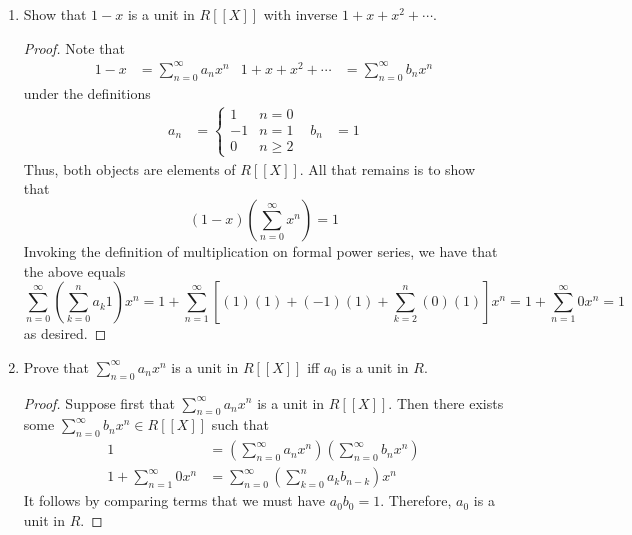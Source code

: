 \documentclass[../psets.tex]{subfiles}
\begin{document}
\begin{enumerate}
\begin{enumerate}[start=2,label={\textbf{(\alph*)}}]
        \item Show that $1-x$ is a unit in $R[[X]]$ with inverse $1+x+x^2+\cdots$.
        \begin{proof}
            Note that
            \begin{align*}
                1-x &= \sum_{n=0}^\infty a_nx^n&
                1+x+x^2+\cdots &= \sum_{n=0}^\infty b_nx^n
            \end{align*}
            under the definitions
            \begin{align*}
                a_n &=
                \begin{cases}
                    1 & n=0\\
                    -1 & n=1\\
                    0 & n\geq 2
                \end{cases}&
                b_n &= 1
            \end{align*}
            Thus, both objects are elements of $R[[X]]$. All that remains is to show that
            \begin{equation*}
                (1-x)\left( \sum_{n=0}^\infty x^n \right) = 1
            \end{equation*}
            Invoking the definition of multiplication on formal power series, we have that the above equals
            \begin{equation*}
                \sum_{n=0}^\infty\left( \sum_{k=0}^na_k1 \right)x^n = 1+\sum_{n=1}^\infty\left[ (1)(1)+(-1)(1)+\sum_{k=2}^n(0)(1) \right]x^n
                = 1+\sum_{n=1}^\infty 0x^n
                = 1
            \end{equation*}
            as desired.
        \end{proof}
        \item Prove that $\sum_{n=0}^\infty a_nx^n$ is a unit in $R[[X]]$ iff $a_0$ is a unit in $R$.
        \begin{proof}
            Suppose first that $\sum_{n=0}^\infty a_nx^n$ is a unit in $R[[X]]$. Then there exists some $\sum_{n=0}^\infty b_nx^n\in R[[X]]$ such that
            \begin{align*}
                1 &= \left( \sum_{n=0}^\infty a_nx^n \right)\left( \sum_{n=0}^\infty b_nx^n \right)\\
                1+\sum_{n=1}^\infty 0x^n &= \sum_{n=0}^\infty\left( \sum_{k=0}^na_kb_{n-k} \right)x^n
            \end{align*}
            It follows by comparing terms that we must have $a_0b_0=1$. Therefore, $a_0$ is a unit in $R$.\par

\end{proof}
\end{enumerate}
\end{enumerate}
\end{document}
